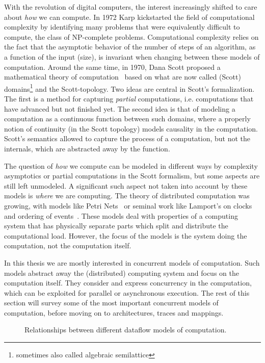 With the revolution of digital computers, the interest increasingly shifted to care about \emph{how} we can compute.
In 1972 Karp\cite{karp1972reducibility} kickstarted the field of computational complexity by identifying many problems that were equivalently difficult to compute, the class of NP-complete problems.
Computational complexity relies on the fact that the asymptotic behavior of the number of steps of an algorithm, as a function of the input (size), is invariant when changing between these models of computation.
Around the same time, in 1970, Dana Scott proposed a mathematical theory of computation~\cite{scott1970} based on what are now called (Scott) domains\footnote{sometimes also called algebraic semilattice} and the Scott-topology. 
Two ideas are central in Scott's formalization. The first is a method for capturing \emph{partial} computations, i.e. computations that have advanced but not finished yet.
The second idea is that of modeling a computation as a continuous function between such domains, where a properly notion of continuity (in the Scott topology) models causality in the computation.
Scott's semantics allowed to capture the process of a computation, but not the internals, which are abstracted away by the function. 

The question of \emph{how} we compute can be modeled in different ways by complexity asymptotics or partial computations in the Scott formalism, but some aspects are still left unmodeled.
A significant such aspect not taken into account by these models is \emph{where} we are computing.
The theory of distributed computation was growing, with models like Petri Nets~\cite{petri1962nets} or seminal work like Lamport's on clocks and ordering of events~\cite{Lamport1978time}.
These models deal with properties of a computing system that has physically separate parts which split and distribute the computational load.
However, the focus of the models is the system doing the computation, not the computation itself.

In this thesis we are mostly interested in concurrent models of computation. 
Such models abstract away the (distributed) computing system and focus on the computation itself. 
They consider and express concurrency in the computation, which can be exploited for parallel or asynchronous execution.
The rest of this section will survey some of the most important concurrent models of computation, before moving on to architectures, traces and mappings.


\begin{figure}[h]
	\centering
   \resizebox{0.55\textwidth}{!}{}
	\caption{Relationships between different dataflow models of computation.}
	\label{fig:dataflow_mocs}
\end{figure}

